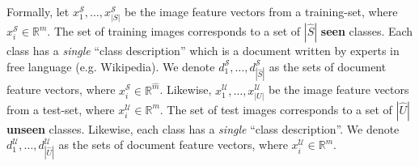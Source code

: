 \documentclass[11pt,a4paper]{article}
\begin{document}



Formally, let $x^{\mathcal{S}}_1,\ldots,x^{\mathcal{S}}_{|S|}$ be the image feature vectors from a training-set, where $x^{\mathcal{S}}_i\in \mathbb{R}^{m}$. The set of training images corresponds to a set of $|\hat{S}|$ \textbf{seen} classes. Each class has a \textit{single} \enquote{class description} which is a document written by experts in free language (e.g.  Wikipedia). We denote  $d^{\mathcal{S}}_1,\ldots,d^{\mathcal{S}}_{|\hat{S}|}$ as the sets of  document feature vectors, 
where $x^{\mathcal{S}}_i\in \mathbb{R}^{\hat{m}}$.
Likewise, $x^{\mathcal{U}}_1,\ldots,x^{\mathcal{U}}_{|U|}$ be the image feature vectors from a test-set, where $x^{\mathcal{U}}_i\in \mathbb{R}^{m}$. The set of test images corresponds to a set of $|\hat{U}|$ \textbf{unseen} classes. Likewise, each class has a \textit{single} \enquote{class description}. We denote  $d^{\mathcal{U}}_1,\ldots,d^{\mathcal{U}}_{|\hat{U}|}$ as the sets of  document feature vectors, 
where $x^{\mathcal{U}}_i\in \mathbb{R}^{\hat{m}}$.
\end{document}
